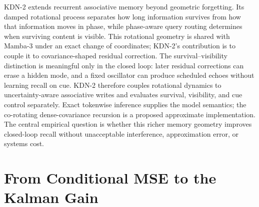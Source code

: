 \documentclass[11pt,letterpaper,logo]{yalearxiv}
\begin{document}
KDN-2 extends recurrent associative memory beyond geometric forgetting. Its damped rotational
process separates how long information survives from how that information moves in phase, while
phase-aware query routing determines when surviving content is visible. This rotational geometry
is shared with Mamba-3 under an exact change of coordinates; KDN-2's contribution is to couple it
to covariance-shaped residual correction. The survival--visibility distinction is
meaningful only in the closed loop: later residual corrections can erase a hidden mode, and a
fixed oscillator can produce scheduled echoes without learning recall on cue. KDN-2 therefore
couples rotational dynamics to uncertainty-aware associative writes and evaluates survival,
visibility, and cue control separately. Exact tokenwise inference supplies the model semantics;
the co-rotating dense-covariance recursion is a proposed approximate implementation. The central
empirical question is whether this richer memory geometry improves closed-loop recall without
unacceptable interference, approximation error, or systems cost.





\appendix

\section{From Conditional MSE to the Kalman Gain}
\label{app:kdn2-optimal-gain}
\end{document}
